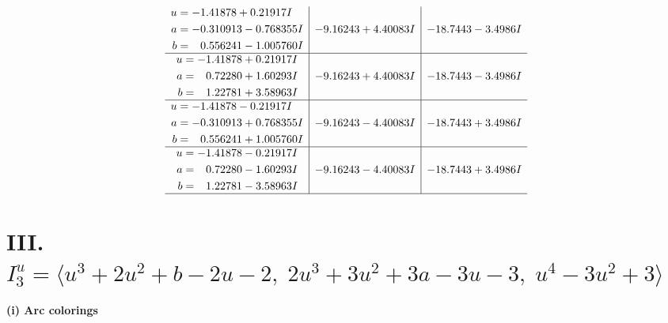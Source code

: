 \documentclass[1p]{elsarticle_modified}
\theoremstyle{definition}
\begin{document}
$$\begin{array}{c|c|c}
\begin{aligned}
u &= -1.41878 + 0.21917 I \\
a &= -0.310913 - 0.768355 I \\
b &= \phantom{-}0.556241 - 1.005760 I\end{aligned}
 & -9.16243 + 4.40083 I & -18.7443 - 3.4986 I \\ \hline\begin{aligned}
u &= -1.41878 + 0.21917 I \\
a &= \phantom{-}0.72280 + 1.60293 I \\
b &= \phantom{-}1.22781 + 3.58963 I\end{aligned}
 & -9.16243 + 4.40083 I & -18.7443 - 3.4986 I \\ \hline\begin{aligned}
u &= -1.41878 - 0.21917 I \\
a &= -0.310913 + 0.768355 I \\
b &= \phantom{-}0.556241 + 1.005760 I\end{aligned}
 & -9.16243 - 4.40083 I & -18.7443 + 3.4986 I \\ \hline\begin{aligned}
u &= -1.41878 - 0.21917 I \\
a &= \phantom{-}0.72280 - 1.60293 I \\
b &= \phantom{-}1.22781 - 3.58963 I\end{aligned}
 & -9.16243 - 4.40083 I & -18.7443 + 3.4986 I\\
 \hline 
 \end{array}$$\newpage\newpage\renewcommand{\arraystretch}{1}
\centering \section*{III. $I^u_{3}= \langle u^3+2 u^2+b-2 u-2,\;2 u^3+3 u^2+3 a-3 u-3,\;u^4-3 u^2+3 \rangle$}
\flushleft \textbf{(i) Arc colorings}\\
\end{document}
